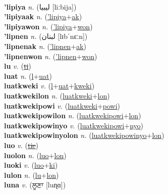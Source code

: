  \label{lip} \\
\textbf{'lipiya} \textit{n.} ({\arabics{}ليبيا‎} [liːbija])
 \label{'lipiya} \\
\textbf{'lipiyaak} \textit{n.} (\hyperref['lipiya]{'lipiya}+\hyperref[ak]{ak})
 \label{'lipiyaak} \\
\textbf{'lipiyawon} \textit{n.} (\hyperref['lipiya]{'lipiya}+\hyperref[won]{won})
 \label{'lipiyawon} \\
\textbf{'lipnen} \textit{n.} ({\arabics{}لبنان‎} [lɪbˈnɛːn])
 \label{'lipnen} \\
\textbf{'lipnenak} \textit{n.} (\hyperref['lipnen]{'lipnen}+\hyperref[ak]{ak})
 \label{'lipnenak} \\
\textbf{'lipnenwon} \textit{n.} (\hyperref['lipnen]{'lipnen}+\hyperref[won]{won})
 \label{'lipnenwon} \\
\textbf{lu} \textit{v.} (\hyperref[ti]{\sout{ti}})
 \label{lu} \\
\textbf{luat} \textit{n.} (\hyperref[l]{l}+\hyperref[uat]{uat})
 \label{luat} \\
\textbf{luatkweki} \textit{v.} (\hyperref[l]{l}+\hyperref[uat]{uat}+\hyperref[kweki]{kweki})
 \label{luatkweki} \\
\textbf{luatkwekilon} \textit{n.} (\hyperref[luatkweki]{luatkweki}+\hyperref[lon]{lon})
 \label{luatkwekilon} \\
\textbf{luatkwekipowi} \textit{v.} (\hyperref[luatkweki]{luatkweki}+\hyperref[powi]{powi})
 \label{luatkwekipowi} \\
\textbf{luatkwekipowilon} \textit{n.} (\hyperref[luatkwekipowi]{luatkwekipowi}+\hyperref[lon]{lon})
 \label{luatkwekipowilon} \\
\textbf{luatkwekipowinyo} \textit{v.} (\hyperref[luatkwekipowi]{luatkwekipowi}+\hyperref[nyo]{nyo})
 \label{luatkwekipowinyo} \\
\textbf{luatkwekipowinyolon} \textit{n.} (\hyperref[luatkwekipowinyo]{luatkwekipowinyo}+\hyperref[lon]{lon})
 \label{luatkwekipowinyolon} \\
\textbf{luo} \textit{v.} (\hyperref[tie]{\sout{tie}})
 \label{luo} \\
\textbf{luolon} \textit{n.} (\hyperref[luo]{luo}+\hyperref[lon]{lon})
 \label{luolon} \\
\textbf{luoki} \textit{v.} (\hyperref[luo]{luo}+\hyperref[ki]{ki})
 \label{luoki} \\
\textbf{lulon} \textit{n.} (\hyperref[lu]{lu}+\hyperref[lon]{lon})
 \label{lulon} \\
\textbf{luna} \textit{v.} ({\gurmukhi{}ਲੂਣਾ} [luɳɑ])
